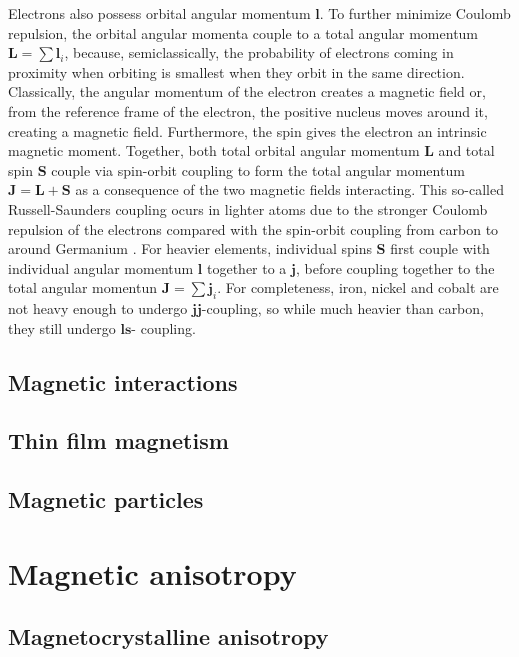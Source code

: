 Electrons also possess orbital angular momentum $\mathbf{l}$.
To further minimize Coulomb repulsion, the orbital angular momenta couple to a total angular momentum $\mathbf{L}=\sum \mathbf{l}_i$, because, semiclassically, the probability of electrons coming in proximity when orbiting is smallest when they orbit in the same direction.
Classically, the angular momentum of the electron creates a magnetic field or, from the reference frame of the electron, the positive nucleus moves around it, creating a magnetic field. 
Furthermore, the spin gives the electron an intrinsic magnetic moment.
Together, both total orbital angular momentum $\mathbf{L}$ and total spin $\mathbf{S}$ couple via spin-orbit coupling to form the total angular momentum $\mathbf{J}=\mathbf{L}+\mathbf{S}$ as a consequence of the two magnetic fields interacting.
This so-called Russell-Saunders coupling ocurs in lighter atoms due to the stronger Coulomb repulsion of the electrons compared with the spin-orbit coupling from carbon to around Germanium . 
For heavier elements, individual spins $\mathbf{S}$ first couple with individual angular momentum $\mathbf{l}$ together to a $\mathbf{j}$, before  coupling together to the total angular momentun $\mathbf{J}=\sum\mathbf{j}
_i$.
For completeness, iron, nickel and cobalt are not heavy enough to undergo $\mathbf{jj}$-coupling, so while much heavier than carbon, they still undergo $ \mathbf{ls}$- coupling. 

\subsection{Magnetic interactions}\label{sec:theory_magnetic_interactions}
\subsection{Thin film magnetism}\label{sec:theory_thin_film_magnetism}
\subsection{Magnetic particles}

\section{Magnetic anisotropy}\label{sec:theory_magnetic_anisotropy}
\subsection{Magnetocrystalline anisotropy}
